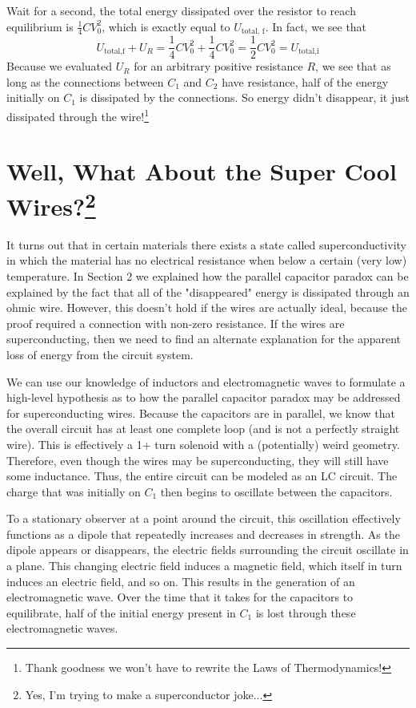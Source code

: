 \documentclass{article}
\begin{document}
Wait for a second, the total energy dissipated over the resistor to reach equilibrium is $\frac{1}{4}CV_0^2$, which is exactly equal to $U_{\text{total, f}}$.  In fact, we see that
\[
U_{\text{total,f}} + U_R = \frac{1}{4}CV_0^2 + \frac{1}{4}CV_0^2 = \frac{1}{2}CV_0^2 = U_{\text{total,i}}
\]
Because we evaluated $U_R$ for an arbitrary positive resistance $R$, we see that as long as the connections between $C_1$ and $C_2$ have resistance, half of the energy initially on $C_1$ is dissipated by the connections.  So energy didn't disappear, it just dissipated through the wire!\footnote{Thank goodness we won't have to rewrite the Laws of Thermodynamics!}

\section{Well, What About the Super Cool Wires?\protect\footnote{Yes, I'm trying to make a superconductor joke...}}

It turns out that in certain materials there exists a state called superconductivity in which the material has no electrical resistance when below a certain (very low) temperature.  In Section 2 we explained how the parallel capacitor paradox can be explained by the fact that all of the "disappeared" energy is dissipated through an ohmic wire.  However, this doesn't hold if the wires are actually ideal, because the proof required a connection with non-zero resistance.  If the wires are superconducting, then we need to find an alternate explanation for the apparent loss of energy from the circuit system.

We can use our knowledge of inductors and electromagnetic waves to formulate a high-level hypothesis as to how the parallel capacitor paradox may be addressed for superconducting wires.  Because the capacitors are in parallel, we know that the overall circuit has at least one complete loop (and is not a perfectly straight wire).  This is effectively a 1+ turn solenoid with a (potentially) weird geometry.  Therefore, even though the wires may be superconducting, they will still have some inductance.  Thus, the entire circuit can be modeled as an LC circuit.  The charge that was initially on $C_1$ then begins to oscillate between the capacitors.

To a stationary observer at a point around the circuit, this oscillation effectively functions as a dipole that repeatedly increases and decreases in strength.  As the dipole appears or disappears, the electric fields surrounding the circuit oscillate in a plane.  This changing electric field induces a magnetic field, which itself in turn induces an electric field, and so on.  This results in the generation of an electromagnetic wave.  Over the time that it takes for the capacitors to equilibrate, half of the initial energy present in $C_1$ is lost through these electromagnetic waves.
\end{document}
